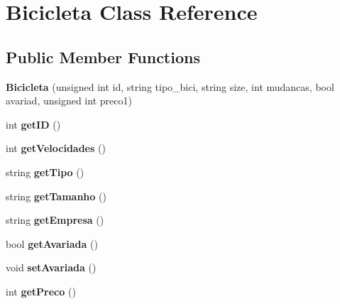 \hypertarget{class_bicicleta}{\section{Bicicleta Class Reference}
\label{class_bicicleta}
}
\subsection*{Public Member Functions}
\begin{DoxyCompactItemize}
\item 
\hypertarget{class_bicicleta_af248a13124a9939cc3fa8eb3be56fdaf}{{\bfseries Bicicleta} (unsigned int id, string tipo\+\_\+bici, string size, int mudancas, bool avariad, unsigned int preco1)}\label{class_bicicleta_af248a13124a9939cc3fa8eb3be56fdaf}

\item 
\hypertarget{class_bicicleta_ac85afd4971d0b6eada6eb16f9a924118}{int {\bfseries get\+I\+D} ()}\label{class_bicicleta_ac85afd4971d0b6eada6eb16f9a924118}

\item 
\hypertarget{class_bicicleta_a956979f7f43934c329b143b9d6c2da49}{int {\bfseries get\+Velocidades} ()}\label{class_bicicleta_a956979f7f43934c329b143b9d6c2da49}

\item 
\hypertarget{class_bicicleta_a4582ea6f608f9d188df0b563961d7df5}{string {\bfseries get\+Tipo} ()}\label{class_bicicleta_a4582ea6f608f9d188df0b563961d7df5}

\item 
\hypertarget{class_bicicleta_a9733b1f60caff10aa814dfe38e8e459f}{string {\bfseries get\+Tamanho} ()}\label{class_bicicleta_a9733b1f60caff10aa814dfe38e8e459f}

\item 
\hypertarget{class_bicicleta_a98ab039cfa35975f6d1ff2223a625a7f}{string {\bfseries get\+Empresa} ()}\label{class_bicicleta_a98ab039cfa35975f6d1ff2223a625a7f}

\item 
\hypertarget{class_bicicleta_adcf9b86f83a83b15c98f70918469e664}{bool {\bfseries get\+Avariada} ()}\label{class_bicicleta_adcf9b86f83a83b15c98f70918469e664}

\item 
\hypertarget{class_bicicleta_a9e95e5a5744c9385a7a270876bf56f8c}{void {\bfseries set\+Avariada} ()}\label{class_bicicleta_a9e95e5a5744c9385a7a270876bf56f8c}

\item 
\hypertarget{class_bicicleta_adfccbf2a5c83a6c34c3454c78244cffc}{int {\bfseries get\+Preco} ()}\label{class_bicicleta_adfccbf2a5c83a6c34c3454c78244cffc}


\end{DoxyCompactItemize}
